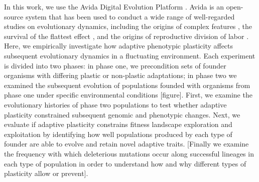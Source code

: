 In this work, we use the Avida Digital Evolution Platform \citep{ofria_avida:_2009}.
Avida is an open-source system that has been used to conduct a wide range of well-regarded studies on evolutionary dynamics, including 
the origins of complex features \citep{lenski_evolutionary_2003},
the survival of the flattest effect \citep{wilke_evolution_2001},
and the origins of reproductive division of labor \citep{goldsby_evolutionary_2014}.
Here, we empirically investigate how adaptive phenotypic plasticity affects subsequent evolutionary dynamics in a fluctuating environment.
Each experiment is divided into two phases: in phase one, we precondition sets of founder organisms with differing plastic or non-plastic adaptations;
in phase two we examined the subsequent evolution of populations founded with organisms from phase one under specific environmental conditions [figure].
First, we examine the evolutionary histories of phase two populations to test whether adaptive plasticity constrained subsequent genomic and phenotypic changes. 
Next, we evaluate if adaptive plasticity constrains fitness landscape exploration and exploitation by identifying how well populations produced by each type of founder are able to evolve and retain novel adaptive traits.
[Finally we examine the frequency with which deleterious mutations occur along successful lineages in each type of population in order to understand how and why different types of plasticity allow or prevent].


